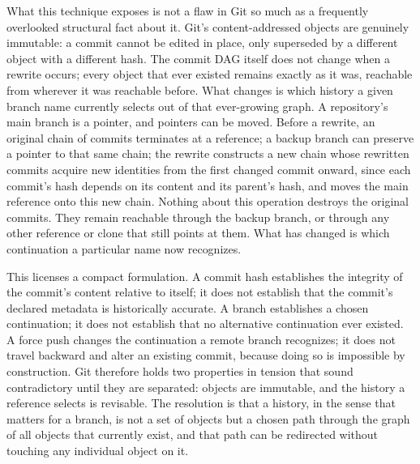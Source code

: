 \documentclass[11pt]{article}
\begin{document}
What this technique exposes is not a flaw in Git so much as a frequently overlooked structural fact about it. Git's content-addressed objects are genuinely immutable: a commit cannot be edited in place, only superseded by a different object with a different hash. The commit DAG itself does not change when a rewrite occurs; every object that ever existed remains exactly as it was, reachable from wherever it was reachable before. What changes is which history a given branch name currently selects out of that ever-growing graph. A repository's main branch is a pointer, and pointers can be moved. Before a rewrite, an original chain of commits terminates at a reference; a backup branch can preserve a pointer to that same chain; the rewrite constructs a new chain whose rewritten commits acquire new identities from the first changed commit onward, since each commit's hash depends on its content and its parent's hash, and moves the main reference onto this new chain. Nothing about this operation destroys the original commits. They remain reachable through the backup branch, or through any other reference or clone that still points at them. What has changed is which continuation a particular name now recognizes.

This licenses a compact formulation. A commit hash establishes the integrity of the commit's content relative to itself; it does not establish that the commit's declared metadata is historically accurate. A branch establishes a chosen continuation; it does not establish that no alternative continuation ever existed. A force push changes the continuation a remote branch recognizes; it does not travel backward and alter an existing commit, because doing so is impossible by construction. Git therefore holds two properties in tension that sound contradictory until they are separated: objects are immutable, and the history a reference selects is revisable. The resolution is that a history, in the sense that matters for a branch, is not a set of objects but a chosen path through the graph of all objects that currently exist, and that path can be redirected without touching any individual object on it.
\end{document}
